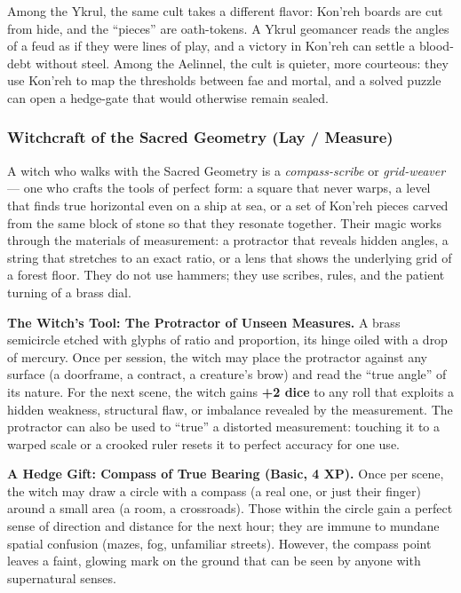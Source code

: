 Among the Ykrul, the same cult takes a different flavor: Kon'reh boards are cut from hide, and the ``pieces'' are oath-tokens. A Ykrul geomancer reads the angles of a feud as if they were lines of play, and a victory in Kon'reh can settle a blood-debt without steel. Among the Aelinnel, the cult is quieter, more courteous: they use Kon'reh to map the thresholds between fae and mortal, and a solved puzzle can open a hedge-gate that would otherwise remain sealed.

\subsubsection*{Witchcraft of the Sacred Geometry (Lay / Measure)}

A witch who walks with the Sacred Geometry is a \textit{compass-scribe} or \textit{grid-weaver} --- one who crafts the tools of perfect form: a square that never warps, a level that finds true horizontal even on a ship at sea, or a set of Kon'reh pieces carved from the same block of stone so that they resonate together. Their magic works through the materials of measurement: a protractor that reveals hidden angles, a string that stretches to an exact ratio, or a lens that shows the underlying grid of a forest floor. They do not use hammers; they use scribes, rules, and the patient turning of a brass dial.

\textbf{The Witch's Tool: The Protractor of Unseen Measures.} A brass semicircle etched with glyphs of ratio and proportion, its hinge oiled with a drop of mercury. Once per session, the witch may place the protractor against any surface (a doorframe, a contract, a creature's brow) and read the ``true angle'' of its nature. For the next scene, the witch gains \textbf{+2 dice} to any roll that exploits a hidden weakness, structural flaw, or imbalance revealed by the measurement. The protractor can also be used to ``true'' a distorted measurement: touching it to a warped scale or a crooked ruler resets it to perfect accuracy for one use.

\textbf{A Hedge Gift: Compass of True Bearing (Basic, 4 XP).} Once per scene, the witch may draw a circle with a compass (a real one, or just their finger) around a small area (a room, a crossroads). Those within the circle gain a perfect sense of direction and distance for the next hour; they are immune to mundane spatial confusion (mazes, fog, unfamiliar streets). However, the compass point leaves a faint, glowing mark on the ground that can be seen by anyone with supernatural senses.

